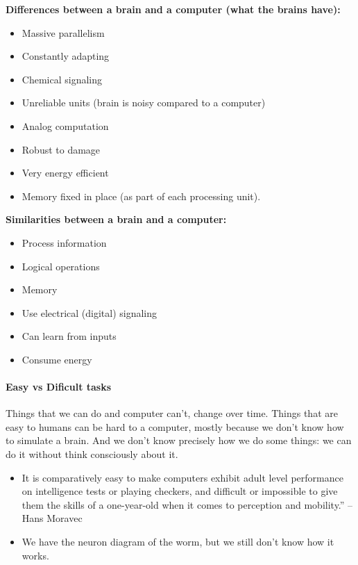 \documentclass[main]{subfiles}
\begin{document}
\textbf{Differences between a brain and a computer (what the brains have):}
\begin{itemize}[noitemsep,nolistsep]
	\item Massive parallelism
	\item Constantly adapting
	\item Chemical signaling
	\item Unreliable units (brain is noisy compared to a computer)
	\item Analog computation
	\item Robust to damage
	\item Very energy efficient
	\item Memory fixed in place (as part of each processing unit).
\end{itemize}
\textbf{Similarities between a brain and a computer:}
\begin{itemize}[noitemsep,nolistsep]
	\item Process information
	\item Logical operations
	\item Memory
	\item Use electrical (digital) signaling
	\item Can learn from inputs
	\item Consume energy
\end{itemize}

\paragraph{Easy vs Dificult tasks}
Things that we can do and computer can't, change over time. Things that are easy to humans can be hard to a computer, mostly because we don't know how to simulate a brain. And we don't know precisely how we do some things: we can do it without think consciously about it.

\begin{itemize}
\item It is comparatively easy to make computers exhibit adult level performance on intelligence tests or playing checkers, and difficult or impossible to give them the skills of a one-year-old when it comes to perception and mobility.” – Hans Moravec
\item We have the neuron diagram of the worm, but we still don't know how it works.
\end{itemize}
\end{document}

